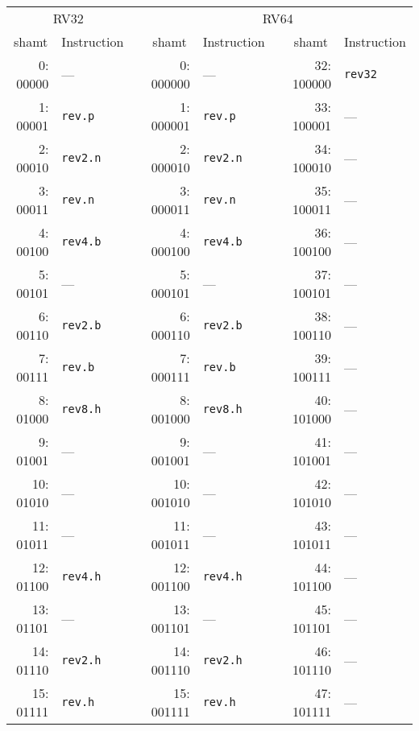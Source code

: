 \begin{table}[h]
\begin{small}
\begin{center}
\begin{tabular}{r l p{0.5in} r l p{0.3in} r l}

\multicolumn{2}{c}{RV32} & &
\multicolumn{5}{c}{RV64} \\

\cline{1-2}
\cline{4-8}

\multicolumn{1}{c}{shamt} & Instruction & &
\multicolumn{1}{c}{shamt} & Instruction & &
\multicolumn{1}{c}{shamt} & Instruction \\

\cline{1-2}
\cline{4-5}
\cline{7-8}

 0: 00000 & ---           &   &  0: 000000 & ---           &   & 32: 100000 & {\tt rev32} \\
 1: 00001 & {\tt rev.p}   &   &  1: 000001 & {\tt rev.p}   &   & 33: 100001 & ---         \\
 2: 00010 & {\tt rev2.n}  &   &  2: 000010 & {\tt rev2.n}  &   & 34: 100010 & ---         \\
 3: 00011 & {\tt rev.n}   &   &  3: 000011 & {\tt rev.n}   &   & 35: 100011 & ---         \\
 4: 00100 & {\tt rev4.b}  &   &  4: 000100 & {\tt rev4.b}  &   & 36: 100100 & ---         \\
 5: 00101 & ---           &   &  5: 000101 & ---           &   & 37: 100101 & ---         \\
 6: 00110 & {\tt rev2.b}  &   &  6: 000110 & {\tt rev2.b}  &   & 38: 100110 & ---         \\
 7: 00111 & {\tt rev.b}   &   &  7: 000111 & {\tt rev.b}   &   & 39: 100111 & ---         \\

\cline{1-2}
\cline{4-5}
\cline{7-8}

 8: 01000 & {\tt rev8.h}  &   &  8: 001000 & {\tt rev8.h}  &   & 40: 101000 & ---         \\
 9: 01001 & ---           &   &  9: 001001 & ---           &   & 41: 101001 & ---         \\
10: 01010 & ---           &   & 10: 001010 & ---           &   & 42: 101010 & ---         \\
11: 01011 & ---           &   & 11: 001011 & ---           &   & 43: 101011 & ---         \\
12: 01100 & {\tt rev4.h}  &   & 12: 001100 & {\tt rev4.h}  &   & 44: 101100 & ---         \\
13: 01101 & ---           &   & 13: 001101 & ---           &   & 45: 101101 & ---         \\
14: 01110 & {\tt rev2.h}  &   & 14: 001110 & {\tt rev2.h}  &   & 46: 101110 & ---         \\
15: 01111 & {\tt rev.h}   &   & 15: 001111 & {\tt rev.h}   &   & 47: 101111 & ---         \\


\end{tabular}
\end{center}
\end{small}
\end{table}
